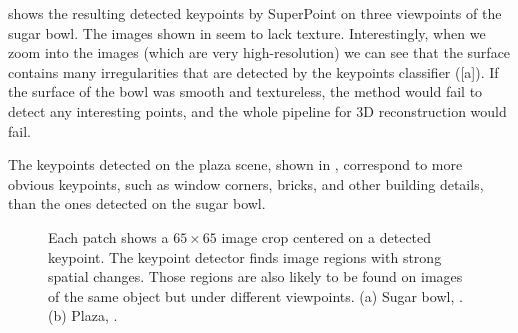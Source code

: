 \Fig{\ref{fig:sfm:keypoints_sugar}} shows the resulting detected keypoints by SuperPoint on three viewpoints of the sugar bowl.
The images shown in \fig{\ref{fig:sfm:sugar}} seem to lack texture. Interestingly, when we zoom into the images (which are very high-resolution) we can see that the surface contains many irregularities that are detected by the keypoints classifier (\fig{\ref{fig:sfm:sugar_keypoints_examples_many}}[a]). If the surface of the bowl was smooth and  textureless, the method would fail to detect any interesting points, and the whole pipeline for 3D reconstruction would fail.

The keypoints detected on the plaza scene, shown in , correspond to more obvious keypoints, such as window corners, bricks, and other building details, than the ones detected on the sugar bowl.

\begin{figure}[t]
    \caption{Each patch shows a $65 \times 65$ image crop centered on a detected keypoint. The keypoint detector finds image regions with strong spatial changes. Those regions are also likely to be found on images of the same object but under different viewpoints. (a) Sugar bowl, \fig{\ref{fig:sfm:sugar}}. (b) Plaza, \fig{\ref{fig:sfm:palma}}.}
    \label{fig:sfm:sugar_keypoints_examples_many}
\end{figure}






